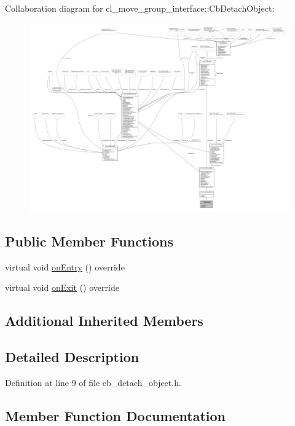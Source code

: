 Collaboration diagram for cl\+\_\+move\+\_\+group\+\_\+interface\+:\+:Cb\+Detach\+Object\+:
\nopagebreak
\begin{figure}[H]
\begin{center}
\leavevmode
\includegraphics[width=350pt]{classcl__move__group__interface_1_1CbDetachObject__coll__graph}
\end{center}
\end{figure}
\subsection*{Public Member Functions}
\begin{DoxyCompactItemize}
\item 
virtual void \hyperlink{classcl__move__group__interface_1_1CbDetachObject_a04af88f1d9b64c43eb2620ac5bd62c35}{on\+Entry} () override
\item 
virtual void \hyperlink{classcl__move__group__interface_1_1CbDetachObject_ae5c6ada3c6631c9fa0bfb2d461ce4678}{on\+Exit} () override
\end{DoxyCompactItemize}
\subsection*{Additional Inherited Members}


\subsection{Detailed Description}


Definition at line 9 of file cb\+\_\+detach\+\_\+object.\+h.



\subsection{Member Function Documentation}
\mbox{\label{classcl__move__group__interface_1_1CbDetachObject_a04af88f1d9b64c43eb2620ac5bd62c35}} 
